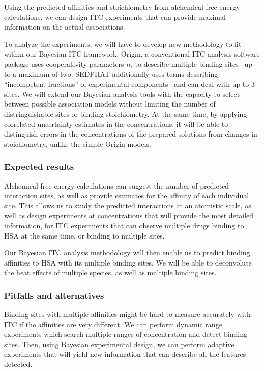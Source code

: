 \documentclass[10pt,final]{article}
\begin{document}

Using the predicted affinities and stoichiometry from alchemical free energy calculations, we can design ITC experiments that can provide maximal information on the actual associations. 

To analyze the experiments, we will have to develop new methodology to fit within our Bayesian ITC framework.
%
Origin, a conventional ITC analysis software package uses cooperativity parameters $n_i$ to describe multiple binding sites~\cite{MicroCal2004a} up to a maximum of two.
%
SEDPHAT additionally uses terms describing ``incompetent fractions'' of experimental components~\cite{Houtman2007a,Zhao2015b} and can deal with up to 3 sites.
%
We will extend our Bayesian analysis tools with the capacity to select between possible association models without limiting the number of distringuishable sites or binding stoichiometry.
%
At the same time, by applying correlated uncertainty estimates in the concentrations, it will be able to distinguish errors in the concentrations of the prepared solutions from changes in stoichiometry, unlike the simple Origin models. 

\subsubsection*{Expected results}
Alchemical free energy calculations can suggest the number of predicted interaction sites, as well as provide estimates for the affinity of each individual site.
This allows us to study the predicted interactions at an atomistic scale, as well as design experiments at concentrations that will provide the most detailed information, for ITC experiments that can observe multiple drugs binding to HSA at the same time, or binding to multiple sites.


Our Bayesian ITC analysis methodology will then enable us to predict binding affinities to HSA with its multiple binding sites. We will be able to deconvolute the heat effects of multiple species, as well as multiple binding sites.

\subsubsection*{Pitfalls and alternatives}
Binding sites with multiple affinities might be hard to measure accurately with ITC if the affinities are very different. We can perform dynamic range experiments which search multiple ranges of concentration and detect binding sites. Then, using Bayesian experimental design, we can perform adaptive experiments that will yield new information that can describe all the features detected.
\end{document}
